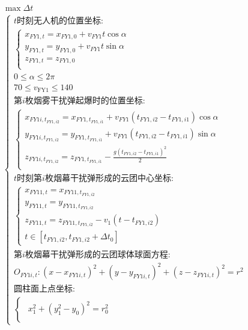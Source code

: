 \documentclass[../main.tex]{subfiles}
\begin{document}
\begin{align}
  \begin{array}{c}
	 \max \Delta t
  \\
\left\{ \begin{array}{l}
	t\text{时刻无人机的位置坐标:}\\
	\left\{ \begin{array}{l}
	x_{FY1,t}=x_{FY1,0}+v_{FY1}t\cos \alpha \\
	y_{FY1,t}=y_{FY1,0}+v_{FY1}t\sin \alpha \\
	z_{FY1,t}=z_{FY1,0}\\
\end{array} \right.\\
	0\leq \alpha \leq 2\pi \\
  70 \leq v_{\text{FY1}} \leq 140\\
	\text{第$i$枚烟雾干扰弹起爆时的位置坐标:}\\
	\left\{ \begin{array}{l}
	x_{FY1i,t_{FY1,i2}}=x_{FY1,t_{FY1,i1}}+v_{FY1}\left( t_{FY1,i2}-t_{FY1,i1} \right) \cos \alpha\\
	y_{FY1i,t_{FY1,i2}}=y_{FY1,t_{FY1,i1}}+v_{FY1}\left( t_{FY1,i2}-t_{FY1,i1} \right) \sin \alpha\\
	z_{FY1i,t_{FY1,i2}}=z_{FY1,t_{FY1,i1}}-\frac{g\left( t_{FY1,i2}-t_{FY1,i1} \right) ^2}{2}\\
\end{array} \right. \\
	t\text{时刻第$i$枚烟幕干扰弹形成的云团中心坐标:}\\
	\left\{ \begin{array}{l}
	x_{FY11,t}=x_{FY11,t_{FY1,i2}}\\
	y_{FY11,t}=y_{FY11,t_{FY1,i2}}\\
	z_{FY11,t}=z_{FY11,t_{FY1,i2}}-v_1\left( t-t_{FY1,i2} \right)\\
	t\in \left[ t_{FY1,i2},t_{FY1,i2}+\Delta t_0 \right]
\end{array} \right.\\
	\text{第$i$枚烟幕干扰弹形成的云团球体球面方程:}\\
	O_{FY1i,t}:\left( x-x_{FY1i,t} \right) ^2+\left( y-y_{FY1i,t} \right) ^2+\left( z-z_{FY1i,t} \right) ^2=r^2
	\\
	\text{圆柱面上点坐标:}\\
	\left\{ \begin{array}{c}
	\begin{array}{l}
	x_{1}^{2}+\left( y_{1}^{2}-y_0 \right) ^2=r_{0}^{2}\\

\end{array}
\end{array}
\end{array}
\end{array}
\end{align}
\end{document}
